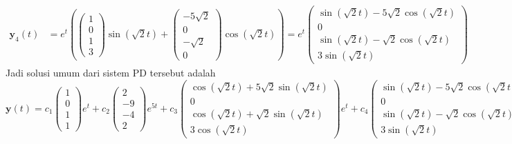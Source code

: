 \documentclass[a4paper]{article}
\theoremstyle{definisi}
\numberwithin{equation}{section}
\begin{document}
\begin{enumerate}
\begin{align*}
      \mathbf{y}_4(t) &= e^t\left(\begin{pmatrix}1\\0\\1\\3\end{pmatrix}\sin(\sqrt{2}t) + \begin{pmatrix}-5\sqrt{2}\\0\\-\sqrt{2}\\0\end{pmatrix}\cos(\sqrt{2}t)\right)= e^t\begin{pmatrix}\sin(\sqrt{2}t)-5\sqrt{2}\cos(\sqrt{2}t)\\0\\\sin(\sqrt{2}t)-\sqrt{2}\cos(\sqrt{2}t)\\3\sin(\sqrt{2}t)\end{pmatrix}
    \end{align*}
    Jadi solusi umum dari sistem PD tersebut adalah
    \[\mathbf{y}(t) = c_1\begin{pmatrix}1\\0\\1\\1\end{pmatrix}e^t + c_2\begin{pmatrix}2\\-9\\-4\\2\end{pmatrix}e^{5t} + c_3\begin{pmatrix}\cos(\sqrt{2}t)+5\sqrt{2}\sin(\sqrt{2}t)\\0\\\cos(\sqrt{2}t)+\sqrt{2}\sin(\sqrt{2}t)\\3\cos(\sqrt{2}t)\end{pmatrix}e^t + c_4\begin{pmatrix}\sin(\sqrt{2}t)-5\sqrt{2}\cos(\sqrt{2}t)\\0\\\sin(\sqrt{2}t)-\sqrt{2}\cos(\sqrt{2}t)\\3\sin(\sqrt{2}t)\end{pmatrix}e^t.\]
    

\end{enumerate}
\end{document}
